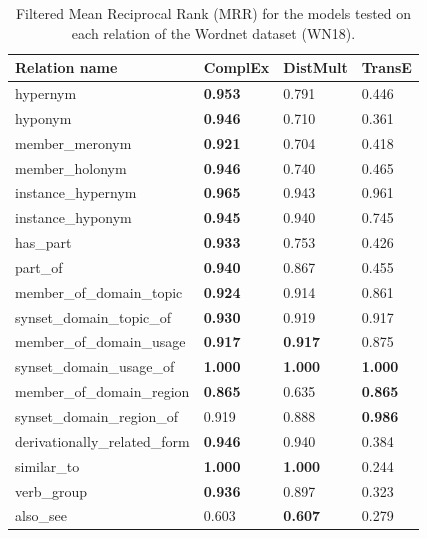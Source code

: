 \documentclass{article}
\begin{document}
\begin{table}
    \begin{tabular}{l|l@{\hspace{0.5em}}l@{}@{\hspace{0.5em}}l@{}}
        
        Relation name & ComplEx & DistMult & TransE\\ \hline
        hypernym  & \textbf{0.953} & 0.791 & 0.446 \\
        hyponym  & \textbf{0.946} & 0.710 & 0.361 \\
        member\_meronym  & \textbf{0.921} & 0.704 & 0.418 \\
        member\_holonym  & \textbf{0.946} & 0.740 & 0.465 \\
        instance\_hypernym  & \textbf{0.965} & 0.943 & 0.961 \\
        instance\_hyponym  & \textbf{0.945} & 0.940 & 0.745 \\
        has\_part  & \textbf{0.933} & 0.753 & 0.426 \\
        part\_of  & \textbf{0.940} & 0.867 & 0.455 \\
        member\_of\_domain\_topic  & \textbf{0.924} & 0.914 & 0.861 \\
        synset\_domain\_topic\_of  & \textbf{0.930} & 0.919 & 0.917 \\
        member\_of\_domain\_usage  & \textbf{0.917} & \textbf{0.917} & 0.875 \\
        synset\_domain\_usage\_of  & \textbf{1.000} & \textbf{1.000} & \textbf{1.000} \\
        member\_of\_domain\_region  & \textbf{0.865} & 0.635 & \textbf{0.865} \\
        synset\_domain\_region\_of  & 0.919 & 0.888 & \textbf{0.986} \\
        derivationally\_related\_form  & \textbf{0.946} & 0.940 & 0.384 \\
        similar\_to  & \textbf{1.000} & \textbf{1.000} & 0.244 \\
        verb\_group  & \textbf{0.936} & 0.897 & 0.323 \\
        also\_see  & 0.603 & \textbf{0.607} & 0.279 \\

    \end{tabular}
    \caption{Filtered Mean Reciprocal Rank (MRR) for the models tested on each relation of the Wordnet dataset (WN18).}
    \label{tab:wn18_detailed_res}
    
    \vspace{-5mm}
\end{table}
\end{document}
